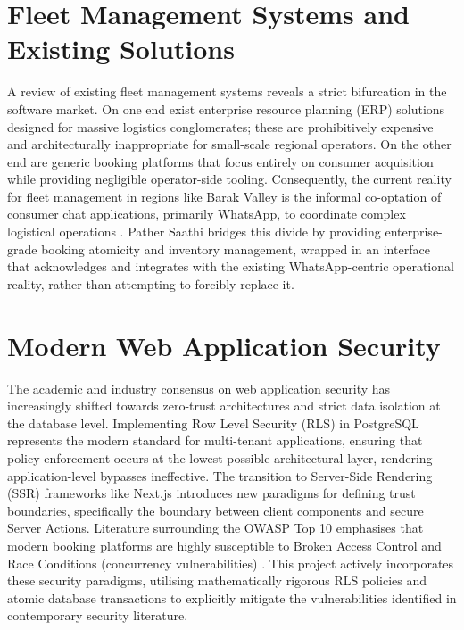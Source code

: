 \documentclass[12pt,a4paper]{report}
\begin{document}
\section{Fleet Management Systems and Existing Solutions}
A review of existing fleet management systems reveals a strict bifurcation in the software market. On one end exist enterprise resource planning (ERP) solutions designed for massive logistics conglomerates; these are prohibitively expensive and architecturally inappropriate for small-scale regional operators. On the other end are generic booking platforms that focus entirely on consumer acquisition while providing negligible operator-side tooling. Consequently, the current reality for fleet management in regions like Barak Valley is the informal co-optation of consumer chat applications, primarily WhatsApp, to coordinate complex logistical operations \cite{indicative2}. Pather Saathi bridges this divide by providing enterprise-grade booking atomicity and inventory management, wrapped in an interface that acknowledges and integrates with the existing WhatsApp-centric operational reality, rather than attempting to forcibly replace it.

\section{Modern Web Application Security}
The academic and industry consensus on web application security has increasingly shifted towards zero-trust architectures and strict data isolation at the database level. Implementing Row Level Security (RLS) in PostgreSQL represents the modern standard for multi-tenant applications, ensuring that policy enforcement occurs at the lowest possible architectural layer, rendering application-level bypasses ineffective. The transition to Server-Side Rendering (SSR) frameworks like Next.js introduces new paradigms for defining trust boundaries, specifically the boundary between client components and secure Server Actions. Literature surrounding the OWASP Top 10 emphasises that modern booking platforms are highly susceptible to Broken Access Control and Race Conditions (concurrency vulnerabilities) \cite{owasp}. This project actively incorporates these security paradigms, utilising mathematically rigorous RLS policies and atomic database transactions to explicitly mitigate the vulnerabilities identified in contemporary security literature.
\end{document}
